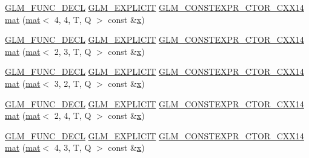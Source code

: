 \begin{DoxyCompactItemize}
\item 
\hyperlink{setup_8hpp_ab2d052de21a70539923e9bcbf6e83a51}{G\+L\+M\+\_\+\+F\+U\+N\+C\+\_\+\+D\+E\+CL} \hyperlink{setup_8hpp_a6c74f5a5e7b134ab69023ff9a30d4d5d}{G\+L\+M\+\_\+\+E\+X\+P\+L\+I\+C\+IT} \hyperlink{setup_8hpp_a0900f9145e68bf6061b6f5e7be3fa751}{G\+L\+M\+\_\+\+C\+O\+N\+S\+T\+E\+X\+P\+R\+\_\+\+C\+T\+O\+R\+\_\+\+C\+X\+X14} \hyperlink{structglm_1_1mat_3_014_00_012_00_01_t_00_01_q_01_4_a58290bbc7d85008b790248acc5213ac3}{mat} (\hyperlink{structglm_1_1mat}{mat}$<$ 4, 4, T, Q $>$ const \&\hyperlink{_s_d_l__opengl_8h_ad0e63d0edcdbd3d79554076bf309fd47}{x})
\item 
\hyperlink{setup_8hpp_ab2d052de21a70539923e9bcbf6e83a51}{G\+L\+M\+\_\+\+F\+U\+N\+C\+\_\+\+D\+E\+CL} \hyperlink{setup_8hpp_a6c74f5a5e7b134ab69023ff9a30d4d5d}{G\+L\+M\+\_\+\+E\+X\+P\+L\+I\+C\+IT} \hyperlink{setup_8hpp_a0900f9145e68bf6061b6f5e7be3fa751}{G\+L\+M\+\_\+\+C\+O\+N\+S\+T\+E\+X\+P\+R\+\_\+\+C\+T\+O\+R\+\_\+\+C\+X\+X14} \hyperlink{structglm_1_1mat_3_014_00_012_00_01_t_00_01_q_01_4_a704b4ee466e5f69aaed70ca9372a1ea6}{mat} (\hyperlink{structglm_1_1mat}{mat}$<$ 2, 3, T, Q $>$ const \&\hyperlink{_s_d_l__opengl_8h_ad0e63d0edcdbd3d79554076bf309fd47}{x})
\item 
\hyperlink{setup_8hpp_ab2d052de21a70539923e9bcbf6e83a51}{G\+L\+M\+\_\+\+F\+U\+N\+C\+\_\+\+D\+E\+CL} \hyperlink{setup_8hpp_a6c74f5a5e7b134ab69023ff9a30d4d5d}{G\+L\+M\+\_\+\+E\+X\+P\+L\+I\+C\+IT} \hyperlink{setup_8hpp_a0900f9145e68bf6061b6f5e7be3fa751}{G\+L\+M\+\_\+\+C\+O\+N\+S\+T\+E\+X\+P\+R\+\_\+\+C\+T\+O\+R\+\_\+\+C\+X\+X14} \hyperlink{structglm_1_1mat_3_014_00_012_00_01_t_00_01_q_01_4_a662e6dea92b46f4a70e17d7debd7746a}{mat} (\hyperlink{structglm_1_1mat}{mat}$<$ 3, 2, T, Q $>$ const \&\hyperlink{_s_d_l__opengl_8h_ad0e63d0edcdbd3d79554076bf309fd47}{x})
\item 
\hyperlink{setup_8hpp_ab2d052de21a70539923e9bcbf6e83a51}{G\+L\+M\+\_\+\+F\+U\+N\+C\+\_\+\+D\+E\+CL} \hyperlink{setup_8hpp_a6c74f5a5e7b134ab69023ff9a30d4d5d}{G\+L\+M\+\_\+\+E\+X\+P\+L\+I\+C\+IT} \hyperlink{setup_8hpp_a0900f9145e68bf6061b6f5e7be3fa751}{G\+L\+M\+\_\+\+C\+O\+N\+S\+T\+E\+X\+P\+R\+\_\+\+C\+T\+O\+R\+\_\+\+C\+X\+X14} \hyperlink{structglm_1_1mat_3_014_00_012_00_01_t_00_01_q_01_4_a5fca139b97b8237bb91ae1f8c5933481}{mat} (\hyperlink{structglm_1_1mat}{mat}$<$ 2, 4, T, Q $>$ const \&\hyperlink{_s_d_l__opengl_8h_ad0e63d0edcdbd3d79554076bf309fd47}{x})
\item 
\hyperlink{setup_8hpp_ab2d052de21a70539923e9bcbf6e83a51}{G\+L\+M\+\_\+\+F\+U\+N\+C\+\_\+\+D\+E\+CL} \hyperlink{setup_8hpp_a6c74f5a5e7b134ab69023ff9a30d4d5d}{G\+L\+M\+\_\+\+E\+X\+P\+L\+I\+C\+IT} \hyperlink{setup_8hpp_a0900f9145e68bf6061b6f5e7be3fa751}{G\+L\+M\+\_\+\+C\+O\+N\+S\+T\+E\+X\+P\+R\+\_\+\+C\+T\+O\+R\+\_\+\+C\+X\+X14} \hyperlink{structglm_1_1mat_3_014_00_012_00_01_t_00_01_q_01_4_a2eca017fb7cd964df37acaac9ab6aaae}{mat} (\hyperlink{structglm_1_1mat}{mat}$<$ 4, 3, T, Q $>$ const \&\hyperlink{_s_d_l__opengl_8h_ad0e63d0edcdbd3d79554076bf309fd47}{x})

\end{DoxyCompactItemize}
